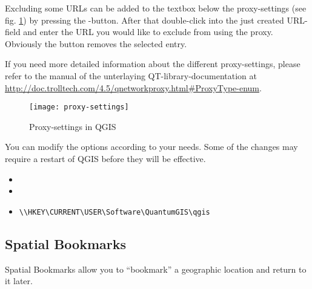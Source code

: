 Excluding some URLs can be added to the textbox below the proxy-settings (see
fig. \ref{fig:proxy-settings}) by pressing the -button. After that
double-click into the just created URL-field and enter the URL you would like
to exclude from using the proxy. Obviously the button  removes the selected
entry.

If you need more detailed information about the different proxy-settings,
please refer to the manual of the unterlaying QT-library-documentation at
\url{http://doc.trolltech.com/4.5/qnetworkproxy.html#ProxyType-enum}.

\begin{figure}[ht]
   \begin{center}
   \caption{Proxy-settings in QGIS \nixcaption}
   \texttt{[image: proxy-settings]}
   \label{fig:proxy-settings}
\end{center} 
\end{figure}

\begin{Tip} \caption{\textsc{Using Proxies}}
\end{Tip}

You can modify the options according to your needs. Some of the changes may 
require a restart of QGIS before they will be effective.

\begin{itemize}
\item {}
\item {}
\item {}
\begin{verbatim}
\\HKEY\CURRENT\USER\Software\QuantumGIS\qgis
\end{verbatim}
\end{itemize}


\subsection{Spatial Bookmarks}\label{sec:bookmarks}

Spatial Bookmarks allow you to ``bookmark'' a geographic location and return to it later.

